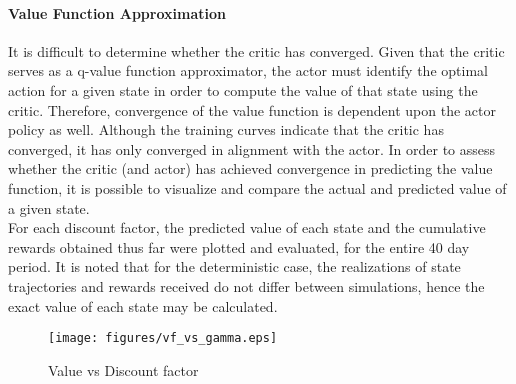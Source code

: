 \paragraph{Value Function Approximation}
It is difficult to determine whether the critic has converged. Given that the critic serves as a q-value function approximator, the actor must identify the optimal action for a given state in order to compute the value of that state using the critic. Therefore, convergence of the value function is dependent upon the actor policy as well. Although the training curves indicate that the critic has converged, it has only converged in alignment with the actor. In order to assess whether the critic (and actor) has achieved convergence in predicting the value function, it is possible to visualize and compare the actual and predicted value of a given state.\\
For each discount factor, the predicted value of each state and the cumulative rewards obtained thus far were plotted and evaluated, for the entire 40 day period. It is noted that for the deterministic case, the realizations of state trajectories and rewards received do not differ between simulations, hence the exact value of each state may be calculated. 


\begin{figure}[H]
    \centering
    \texttt{[image: figures/vf\_vs\_gamma.eps]}
    \caption{Value vs Discount factor}
    \label{fig:vf-vs-gamma}
\end{figure}

